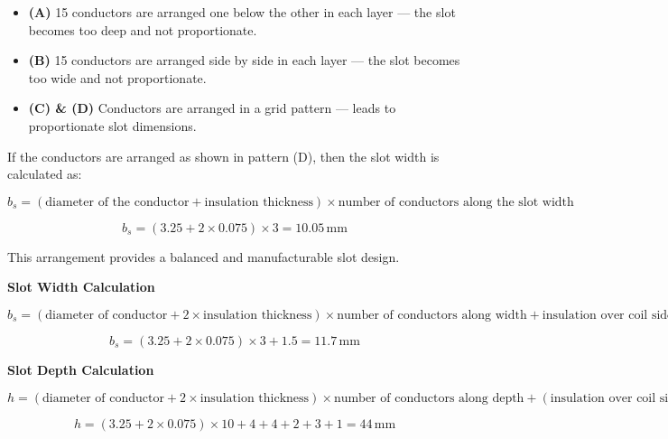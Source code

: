 \documentclass[12pt]{article}
\begin{document}
\begin{itemize}
	\item \textbf{(A)} 15 conductors are arranged one below the other in each layer — the slot becomes too deep and not proportionate.
	\item \textbf{(B)} 15 conductors are arranged side by side in each layer — the slot becomes too wide and not proportionate.
	\item \textbf{(C) \& (D)} Conductors are arranged in a grid pattern — leads to proportionate slot dimensions.
\end{itemize}

If the conductors are arranged as shown in pattern (D), then the slot width is calculated as:

\[
b_s = (\text{diameter of the conductor} + \text{insulation thickness}) \times \text{number of conductors along the slot width}
\]

\[
b_s = (3.25 + 2 \times 0.075) \times 3 = 10.05\, \text{mm}
\]

\vspace{5pt}

\noindent
This arrangement provides a balanced and manufacturable slot design.












\vspace{10pt}

\noindent
\textbf{Slot Width Calculation}

\[
b_s = (\text{diameter of conductor} + 2 \times \text{insulation thickness}) \times \text{number of conductors along width} + \text{insulation over coil sides} + \text{slot liner} + \text{clearance}
\]

\[
b_s = (3.25 + 2 \times 0.075) \times 3 + 1.5 = 11.7\, \text{mm}
\]

\vspace{10pt}

\noindent
\textbf{Slot Depth Calculation}

\[
h = (\text{diameter of conductor} + 2 \times \text{insulation thickness}) \times \text{number of conductors along depth} + (\text{insulation over coil sides} + \text{slot liner} + \text{separator} + \text{clearance}) + \text{wedge thickness} + \text{lip thickness}
\]

\[
h = (3.25 + 2 \times 0.075) \times 10 + 4 + 4 + 2 + 3 + 1 = 44\, \text{mm}
\]
\end{document}
